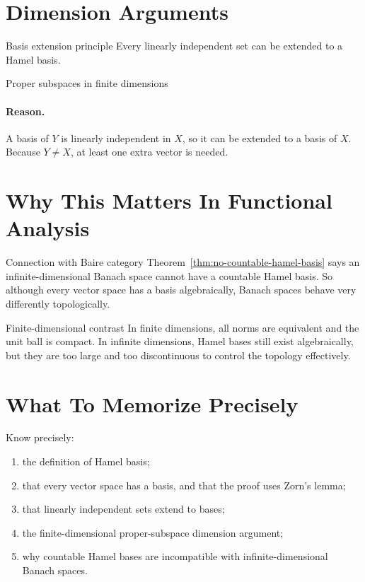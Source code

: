 \documentclass[header={Appendix C Exam Study Notes}]{study-note}
\begin{document}
\section{Dimension Arguments}

\begin{thmbox}{Basis extension principle}
Every linearly independent set can be extended to a Hamel basis.
\end{thmbox}

\begin{thmbox}{Proper subspaces in finite dimensions}
\thmProperSubspace
\end{thmbox}

\paragraph{Reason.}
A basis of $Y$ is linearly independent in $X$, so it can be extended to a basis of $X$. Because $Y\neq X$, at least one extra vector is needed.

\section{Why This Matters In Functional Analysis}

\begin{exbox}{Connection with Baire category}
Theorem~\ref{thm:no-countable-hamel-basis} says an infinite-dimensional Banach space cannot have a countable Hamel basis. So although every vector space has a basis algebraically, Banach spaces behave very differently topologically.
\end{exbox}

\begin{exbox}{Finite-dimensional contrast}
In finite dimensions, all norms are equivalent and the unit ball is compact. In infinite dimensions, Hamel bases still exist algebraically, but they are too large and too discontinuous to control the topology effectively.
\end{exbox}

\section{What To Memorize Precisely}

\begin{focusbox}
Know precisely:
\begin{enumerate}
\item the definition of Hamel basis;
\item that every vector space has a basis, and that the proof uses Zorn's lemma;
\item that linearly independent sets extend to bases;
\item the finite-dimensional proper-subspace dimension argument;
\item why countable Hamel bases are incompatible with infinite-dimensional Banach spaces.
\end{enumerate}
\end{focusbox}
\end{document}
